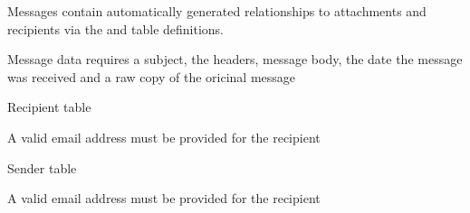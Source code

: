 \documentclass[letterpaper,10pt,english]{sphinxmanual}
\begin{document}

\begin{fulllineitems}
\label{codedocs/database:database.SQLAlchemy.Message}
Messages contain automatically generated relationships to attachments and recipients via the  and  table definitions.

\begin{fulllineitems}
\label{codedocs/database:database.SQLAlchemy.Message.__init__}
Message data requires a subject, the headers, message body, the date the message was received and a raw copy of the oricinal message

\end{fulllineitems}


\end{fulllineitems}


\begin{fulllineitems}
\label{codedocs/database:database.SQLAlchemy.Recipient}
Recipient table

\begin{fulllineitems}
\label{codedocs/database:database.SQLAlchemy.Recipient.__init__}
A valid email address must be provided for the recipient

\end{fulllineitems}


\end{fulllineitems}


\begin{fulllineitems}
\label{codedocs/database:database.SQLAlchemy.Sender}
Sender table

\begin{fulllineitems}
\label{codedocs/database:database.SQLAlchemy.Sender.__init__}
A valid email address must be provided for the recipient

\end{fulllineitems}


\end{fulllineitems}
\end{document}
